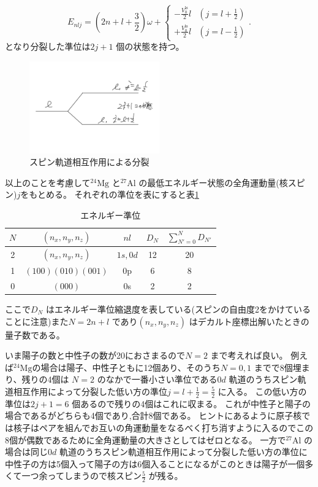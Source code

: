 \documentclass[dvipdfmx]{jsarticle}
\begin{document}
\[
E_{nlj}=(2n+l+\frac{3}{2})\omega+\begin{cases}
	-\frac{V_0^{\text{ls}}}{2}l &\left( j=l+\frac{1}{2} \right) \\
	+\frac{V_0^{\text{ls}}}{2}l &\left( j=l-\frac{1}{2} \right)
\end{cases}
.\] 
となり分裂した準位は$2j+1$ 個の状態を持つ。
\begin{figure}[H]
	\centering
	\includegraphics[width=0.5\textwidth]{Fig-4.jpg}
	\caption{スピン軌道相互作用による分裂}
	\label{fig:fig4-Fig-4-jpg}
\end{figure}
以上のことを考慮して$\mathrm{^{24}Mg}$ と$\mathrm{^{27}Al}$ の最低エネルギー状態の全角運動量(核スピン)$j$をもとめる。
それぞれの準位を表にすると表\ref{tab:1}
\begin{table}[H]
	\centering
	\caption{エネルギー準位}
	\label{tab:1}
	\begin{tabular}{ccccc}\hline
	 $N$& $(n_x,n_y,n_z)$ &$nl$  &$D_N$  & $\sum_{N'=0}^{N} D_{N'}$ \\ \hline

	 2& $(n_x,n_y,n_z)$ &$1s,0d$  &12  & 20 \\
	 1& $(100)(010)(001)$ &0p  &6  & 8 \\
	 0& $(000)$ &0s  &2  & 2 \\ \hline
	\end{tabular}
\end{table}
ここで$D_N$  はエネルギー準位縮退度を表している(スピンの自由度2をかけていることに注意)また$N=2n+l$ であり$(n_x,n_y,n_z)$ はデカルト座標出解いたときの量子数である。

いま陽子の数と中性子の数が20におさまるので$N=2$ まで考えれば良い。
例えば$\mathrm{^{24}Mg}$の場合は陽子、中性子ともに12個あり、そのうち$N=0,1$ までで8個埋まり、残りの4個は
$N=2$ のなかで一番小さい準位である$0d$ 軌道のうちスピン軌道相互作用によって分裂した低い方の準位$j=l+\frac{1}{2}=\frac{5}{2}$ に入る。
この低い方の準位は$2j+1=6$ 個あるので残りの4個はこれに収まる。
これが中性子と陽子の場合であるがどちらも4個であり,合計8個である。
ヒントにあるように原子核では核子はペアを組んでお互いの角運動量をなるべく打ち消すように入るのでこの8個が偶数であるために全角運動量の大きさとしてはゼロとなる。
一方で$\mathrm{^{27}Al}$ の場合は同じ$0d$ 軌道のうちスピン軌道相互作用によって分裂した低い方の準位に中性子の方は5個入って陽子の方は6個入ることになるがこのときは陽子が一個多くて一つ余ってしまうので核スピン$\frac{5}{2}$ が残る。
\end{document}
